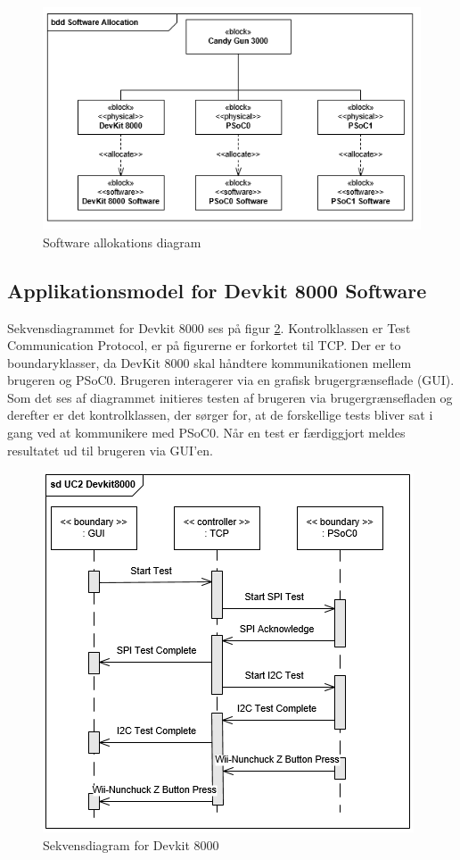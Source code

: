 \begin{figure}[H]
	\centering
	\includegraphics[width=\textwidth]{Systemarkitektur/images/SoftwareAllocation.png}
	\caption{Software allokations diagram}
	\label{fig:softwareAllocation}
\end{figure}

\subsection{Applikationsmodel for Devkit 8000 Software}
Sekvensdiagrammet for Devkit 8000 ses på figur \ref{fig:sekvensDevkit}. Kontrolklassen er Test Communication Protocol, er på figurerne er forkortet til TCP. Der er to boundaryklasser, da DevKit 8000 skal håndtere kommunikationen mellem brugeren og PSoC0. Brugeren interagerer via en grafisk brugergrænseflade (GUI). Som det ses af diagrammet initieres testen af brugeren via brugergrænsefladen og derefter er det kontrolklassen, der sørger for, at de forskellige tests bliver sat i gang ved at kommunikere med PSoC0. Når en test er færdiggjort meldes resultatet ud til brugeren via GUI'en.

\begin{figure}[H]
	\centering
	\includegraphics[]{Systemarkitektur/images/DevKit8000SequenceDiagram.png}
	\caption{Sekvensdiagram for Devkit 8000}
	\label{fig:sekvensDevkit}
\end{figure}

